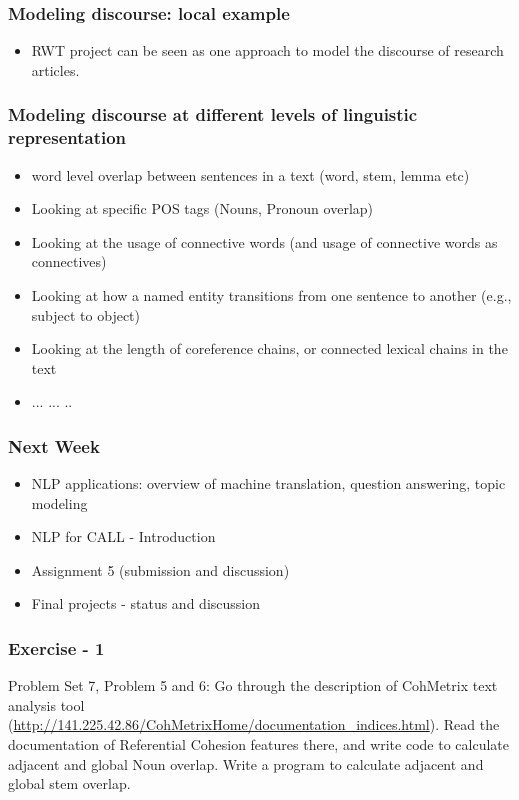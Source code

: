 \documentclass{beamer}
\begin{document}
\begin{frame}
\frametitle{Modeling discourse: local example}
\begin{itemize}
\item RWT project can be seen as one approach to model the discourse of research articles. 
\end{itemize}
\end{frame}

\begin{frame}
\frametitle{Modeling discourse at different levels of linguistic representation}
\begin{itemize}
\item word level overlap between sentences in a text (word, stem, lemma etc)
\item Looking at specific POS tags (Nouns, Pronoun overlap)
\item Looking at the usage of connective words (and usage of connective words as connectives)
\item Looking at how a named entity transitions from one sentence to another (e.g., subject to object)
\item Looking at the length of coreference chains, or connected lexical chains in the text
\item ... ... ..
\end{itemize}
\end{frame}

\begin{frame}
\frametitle{Next Week}
\begin{itemize}
\item NLP applications: overview of machine translation, question answering, topic modeling
\item NLP for CALL - Introduction
\item Assignment 5 (submission and discussion)
\item Final projects - status and discussion 
\end{itemize}
\end{frame}

\begin{frame}
\frametitle{Exercise - 1}
Problem Set 7, Problem 5 and 6: Go through the description of CohMetrix text analysis tool (\url{http://141.225.42.86/CohMetrixHome/documentation_indices.html}).
Read the documentation of Referential Cohesion features there, and
write code to calculate adjacent and global Noun overlap. Write a program to calculate adjacent and global stem overlap.
\end{frame}
\end{document}
